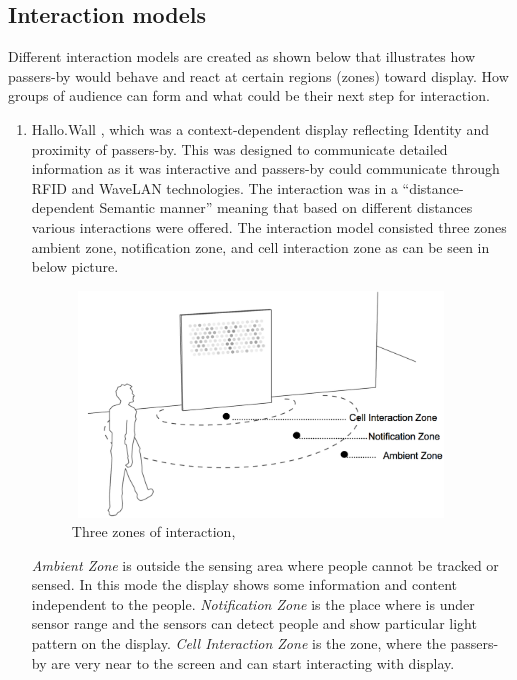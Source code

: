 \subsection{Interaction models}
Different interaction models are created as shown below that illustrates how passers-by would behave and react at certain regions (zones) toward display. How groups of audience can form and what could be their next step for interaction. 

\begin{enumerate}

\item Hallo.Wall \cite{hello_wall, hellow_wall_2}, which was a context-dependent display reflecting Identity and proximity of passers-by. This was designed to communicate detailed information as it was interactive and passers-by could communicate through RFID and WaveLAN technologies. The interaction was in a ``distance-dependent Semantic manner'' meaning that based on different distances various interactions were offered. The interaction model consisted three zones ambient zone, notification zone, and cell interaction zone as can be seen in below picture. 

\begin{figure}[H]
\centering
\includegraphics[width=100mm,height=60mm]{Figures/2/hello_wall}
\caption{Three zones of interaction, \cite{hellow_wall_2}}
\label{fig:threezoneofinteraction}
\end{figure}

\emph{Ambient Zone} is outside the sensing area where people cannot be tracked or sensed. In this mode the display shows some information and content independent to the people. \emph{Notification Zone} is the place where is under sensor range and the sensors can detect people and show particular light pattern on the display. \emph{Cell Interaction Zone} is the zone, where the passers-by are very near to the screen and can start interacting with display. 


\end{enumerate}
